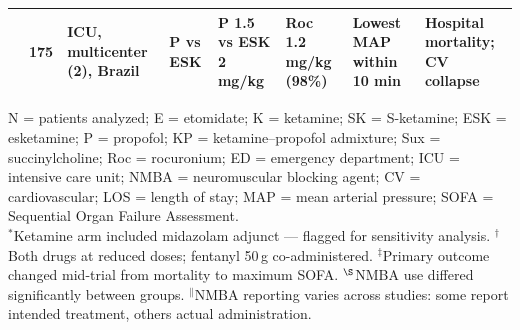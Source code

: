 \documentclass[11pt]{article}
\begin{document}
\begin{landscape}
\begin{table}[p]
\begin{tabularx}{\linewidth}{L{2.2cm} R{0.5cm} L{2.5cm} L{2cm} L{2.3cm} L{2cm} L{2.5cm} L{2.5cm}}
  & 175 & ICU, multicenter (2), Brazil
  & P vs ESK & P 1.5 vs ESK 2 mg/kg & Roc 1.2 mg/kg (98\%)
  & Lowest MAP within 10 min & Hospital mortality; CV collapse \\
\bottomrule
\end{tabularx}
\vspace{4pt}
\raggedright\footnotesize
N = patients analyzed; E = etomidate; K = ketamine; SK = S-ketamine; ESK = esketamine; P = propofol; KP = ketamine--propofol admixture; Sux = succinylcholine; Roc = rocuronium; ED = emergency department; ICU = intensive care unit; NMBA = neuromuscular blocking agent; CV = cardiovascular; LOS = length of stay; MAP = mean arterial pressure; SOFA = Sequential Organ Failure Assessment.\\
$^{*}$Ketamine arm included midazolam adjunct --- flagged for sensitivity analysis.
$^{\dagger}$Both drugs at reduced doses; fentanyl 50\,\textmu g co-administered.
$^{\ddagger}$Primary outcome changed mid-trial from mortality to maximum SOFA.
$^{\S}$NMBA use differed significantly between groups.
$^{\|}$NMBA reporting varies across studies: some report intended treatment, others actual administration.
\end{table}
\end{landscape}
\end{document}
